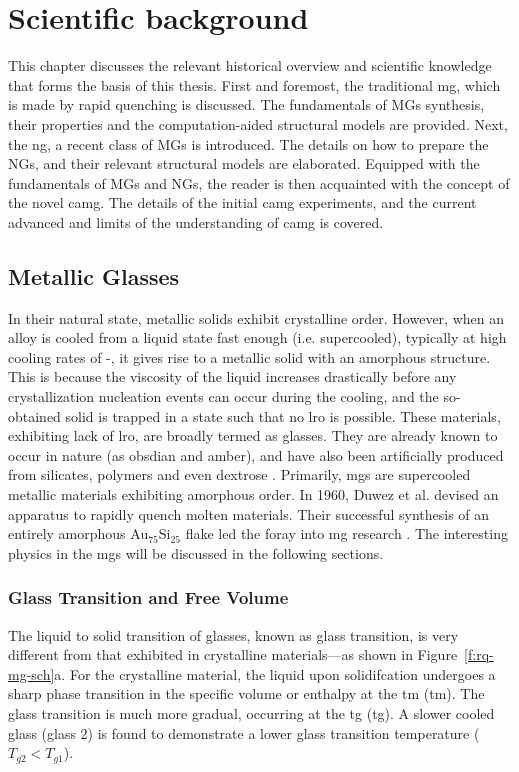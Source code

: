 \chapter{Scientific background} \label{c:theory}
This chapter discusses the relevant historical overview and scientific knowledge that forms the basis of this thesis. First and foremost, the traditional \gls{mg}, which is made by rapid quenching is discussed. The fundamentals of MGs synthesis, their properties and the computation-aided structural models are provided. Next, the \gls{ng}, a recent class of MGs is introduced. The details on how to prepare the NGs, and their relevant structural models are elaborated. Equipped with the fundamentals of MGs and NGs, the reader is then acquainted with the concept of the novel \gls{camg}. The details of the initial \gls{camg} experiments, and the current advanced and limits of the understanding of \gls{camg} is covered.  \par 

\section{Metallic Glasses} \label{s:mg}
In their natural state, metallic solids exhibit crystalline order. However, when an alloy is cooled from a liquid state fast enough (i.e. supercooled), typically at high cooling rates of -, it gives rise to a metallic solid with an amorphous structure. This is because the viscosity of the liquid increases drastically before any crystallization nucleation events can occur during the cooling, and the so-obtained solid is trapped in a state such that no \gls{lro} is possible. These materials, exhibiting lack of \gls{lro}, are broadly termed as glasses. They are already known to occur in nature (as obsdian and amber), and have also been artificially produced from silicates, polymers and even dextrose \cite{Doremus1994,Berthier2016}. Primarily, \gls{mg}s are supercooled metallic materials exhibiting amorphous order. In 1960, Duwez et al. \cite{Klement1960,Duwez1960} devised an apparatus to rapidly quench molten materials. Their successful synthesis of an entirely amorphous \mbox{Au$_{75}$Si$_{25}$} flake led the foray into \gls{mg} research \cite{Klement1960}. The interesting physics in the \gls{mg}s will be discussed in the following sections. \par

\subsection{Glass Transition and Free Volume} \label{s:gt-fv}
The liquid to solid transition of glasses, known as glass transition, is very different from that exhibited in crystalline materials---as shown in Figure~\ref{f:rq-mg-sch}a. For the crystalline material, the liquid upon solidifcation undergoes a sharp phase transition in the specific volume or enthalpy at the \glsdesc{tm} (\gls{tm}). The glass transition is much more gradual, occurring at the \glsdesc{tg} (\gls{tg}).  A slower cooled glass (glass 2) is found to demonstrate a lower glass transition temperature ($T_{g2} < T_{g1}$). \par

